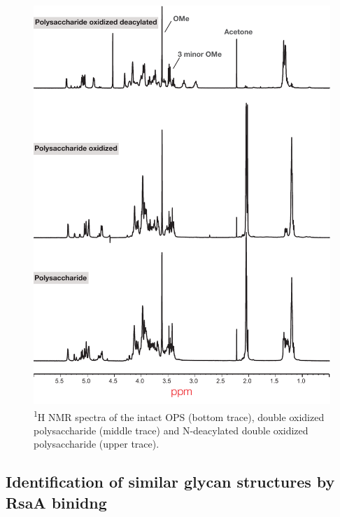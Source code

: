   \begin{figure}[ph] %
    \begin{center}
      \includegraphics[height=0.9\textheight]{lps_chapter/img/lpsfig1.pdf}
    \end{center}
    \caption[\textsuperscript{1}H \ac{NMR} spectra of \caulobacter{} \ac{OPS}]{\textsuperscript{1}H
      \ac{NMR} spectra of the intact \caulobacter{} \ac{OPS} (bottom trace), double oxidized
      polysaccharide (middle trace) and N-deacylated double oxidized polysaccharide (upper trace).}
    \label{fig:lpsfig1}
  \end{figure}

  \subsection{Identification of similar glycan structures by RsaA binidng} \label{sec:ident-simil-glyc}
  
